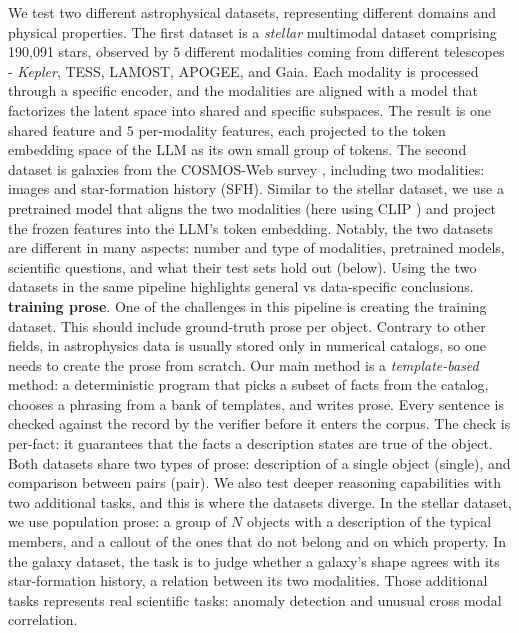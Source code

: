 We test two different astrophysical datasets, representing different domains and physical properties. The first dataset is a \emph{stellar} multimodal dataset comprising 190,091 stars, observed by $5$ different modalities coming from different telescopes - \emph{Kepler}\citep{kepler:mission}, TESS\citep{tess:mission}, LAMOST\citep{lamost:survey}, APOGEE\citep{apogee:mission}, and Gaia\citep{gaia:mission}. Each modality is processed through a specific encoder, and the modalities are aligned with a model that factorizes the latent space into shared and specific subspaces. The result is one shared feature and $5$ per-modality features, each projected to the token embedding space of the LLM as its own small group of tokens. The second dataset is galaxies from the COSMOS-Web survey \citep{Casey2023_cosmos-web}, including two modalities: images and star-formation history (SFH). Similar to the stellar dataset, we use a pretrained model that aligns the two modalities (here using CLIP \cite{Radford2021_CLIP}) and project the frozen features into the LLM's token embedding. Notably, the two datasets are different in many aspects: number and type of modalities, pretrained models, scientific questions, and what their test sets hold out (below). Using the two datasets in the same pipeline highlights general vs data-specific conclusions.\\  
\textbf{training prose}. One of the challenges in this pipeline is creating the training dataset. This should include ground-truth prose per object. Contrary to other fields, in astrophysics data is usually stored only in numerical catalogs, so one needs to create the prose from scratch. Our main method is a \emph{template-based} method: a deterministic program that picks a subset of facts from the catalog, chooses a phrasing from a bank of templates, and
writes prose. Every sentence is checked against the record by the verifier before it enters the corpus. The
check is per-fact: it guarantees that the facts a description states are true of the object.
Both datasets share two types of prose: description of a single object (single), and comparison between pairs (pair).
We also test deeper reasoning capabilities with two additional tasks, and this is where the datasets diverge.
In the stellar dataset, we use population prose: a group of $N$ objects with a description of the typical members, and a callout
of the ones that do not belong and on which property. In the galaxy dataset, the task is to judge whether a galaxy's shape agrees with
its star-formation history, a relation between its two modalities. Those additional tasks represents real scientific tasks:
anomaly detection and unusual cross modal correlation. 

